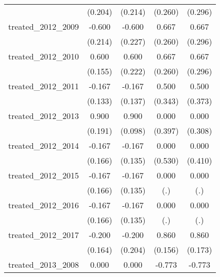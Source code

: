 {\begin{tabular}{l*{4}{c}}
            &     (0.204)         &     (0.214)         &     (0.260)         &     (0.296)         \\
[1em]
treated\_2012\_2009&      -0.600\sym{**} &      -0.600\sym{**} &       0.667\sym{*}  &       0.667\sym{*}  \\
            &     (0.214)         &     (0.227)         &     (0.260)         &     (0.296)         \\
[1em]
treated\_2012\_2010&       0.600\sym{***}&       0.600\sym{**} &       0.667\sym{*}  &       0.667\sym{*}  \\
            &     (0.155)         &     (0.222)         &     (0.260)         &     (0.296)         \\
[1em]
treated\_2012\_2011&      -0.167         &      -0.167         &       0.500         &       0.500         \\
            &     (0.133)         &     (0.137)         &     (0.343)         &     (0.373)         \\
[1em]
treated\_2012\_2013&       0.900\sym{***}&       0.900\sym{***}&       0.000         &       0.000         \\
            &     (0.191)         &     (0.098)         &     (0.397)         &     (0.308)         \\
[1em]
treated\_2012\_2014&      -0.167         &      -0.167         &       0.000         &       0.000         \\
            &     (0.166)         &     (0.135)         &     (0.530)         &     (0.410)         \\
[1em]
treated\_2012\_2015&      -0.167         &      -0.167         &       0.000         &       0.000         \\
            &     (0.166)         &     (0.135)         &         (.)         &         (.)         \\
[1em]
treated\_2012\_2016&      -0.167         &      -0.167         &       0.000         &       0.000         \\
            &     (0.166)         &     (0.135)         &         (.)         &         (.)         \\
[1em]
treated\_2012\_2017&      -0.200         &      -0.200         &       0.860\sym{***}&       0.860\sym{***}\\
            &     (0.164)         &     (0.204)         &     (0.156)         &     (0.173)         \\
[1em]
treated\_2013\_2008&       0.000         &       0.000         &      -0.773\sym{**} &      -0.773\sym{*}  \\

\end{tabular}}

